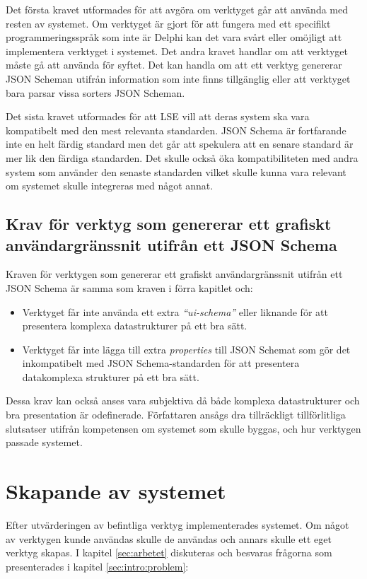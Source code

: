Det första kravet utformades för att avgöra om verktyget går att använda med resten av systemet. Om verktyget är gjort för att fungera med ett specifikt programmeringsspråk som inte är Delphi kan det vara svårt eller omöjligt att implementera verktyget i systemet. Det andra kravet handlar om att verktyget måste gå att använda för syftet. Det kan handla om att ett verktyg genererar JSON Scheman utifrån information som inte finns tillgänglig eller att verktyget bara parsar vissa sorters JSON Scheman.

Det sista kravet utformades för att LSE vill att deras system ska vara kompatibelt med den mest relevanta standarden. JSON Schema är fortfarande inte en helt färdig standard men det går att spekulera att en senare standard är mer lik den färdiga standarden. Det skulle också öka kompatibiliteten med andra system som använder den senaste standarden vilket skulle kunna vara relevant om systemet skulle integreras med något annat.

\subsection{Krav för verktyg som genererar ett grafiskt användargränssnit utifrån ett JSON Schema}
Kraven för verktygen som genererar ett grafiskt användargränssnit utifrån ett JSON Schema är samma som kraven i förra kapitlet och:

\begin{itemize}
	\item Verktyget får inte använda ett extra \textit{``ui-schema''} eller liknande för att presentera komplexa datastrukturer på ett bra sätt.
	\item Verktyget får inte lägga till extra \textit{properties} till JSON Schemat som gör det inkompatibelt med JSON Schema-standarden för att presentera datakomplexa strukturer på ett bra sätt.
\end{itemize}

Dessa krav kan också anses vara subjektiva då både komplexa datastrukturer och bra presentation är odefinerade. Författaren ansågs dra tillräckligt tillförlitliga slutsatser utifrån kompetensen om systemet som skulle byggas, och hur verktygen passade systemet.

\section{Skapande av systemet}
\label{sec:metod:praktiska-frågor}
Efter utvärderingen av befintliga verktyg implementerades systemet. Om något av verktygen kunde användas skulle de användas och annars skulle ett eget verktyg skapas. I kapitel \ref{sec:arbetet} diskuteras och besvaras frågorna som presenterades i kapitel \ref{sec:intro:problem}:

